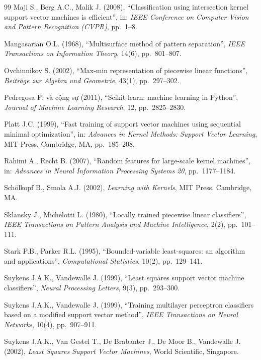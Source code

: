 \begin{thebibliography}{99}
 Maji S., Berg A.C., Malik J. (2008), “Classification using intersection kernel support vector machines is efficient”, in: \emph{IEEE Conference on Computer Vision and Pattern Recognition (CVPR)}, pp.~1--8.

 Mangasarian O.L. (1968), “Multisurface method of pattern separation”, \emph{IEEE Transactions on Information Theory}, 14(6), pp.~801--807.

 Ovchinnikov S. (2002), “Max-min representation of piecewise linear functions”, \emph{Beiträge zur Algebra und Geometrie}, 43(1), pp.~297--302.

 Pedregosa F. và cộng sự (2011), “Scikit-learn: machine learning in Python”, \emph{Journal of Machine Learning Research}, 12, pp.~2825--2830.

 Platt J.C. (1999), “Fast training of support vector machines using sequential minimal optimization”, in: \emph{Advances in Kernel Methods: Support Vector Learning}, MIT Press, Cambridge, MA, pp.~185--208.

 Rahimi A., Recht B. (2007), “Random features for large-scale kernel machines”, in: \emph{Advances in Neural Information Processing Systems 20}, pp.~1177--1184.

 Schölkopf B., Smola A.J. (2002), \emph{Learning with Kernels}, MIT Press, Cambridge, MA.

 Sklansky J., Michelotti L. (1980), “Locally trained piecewise linear classifiers”, \emph{IEEE Transactions on Pattern Analysis and Machine Intelligence}, 2(2), pp.~101--111.

 Stark P.B., Parker R.L. (1995), “Bounded-variable least-squares: an algorithm and applications”, \emph{Computational Statistics}, 10(2), pp.~129--141.

 Suykens J.A.K., Vandewalle J. (1999), “Least squares support vector machine classifiers”, \emph{Neural Processing Letters}, 9(3), pp.~293--300.

 Suykens J.A.K., Vandewalle J. (1999), “Training multilayer perceptron classifiers based on a modified support vector method”, \emph{IEEE Transactions on Neural Networks}, 10(4), pp.~907--911.

 Suykens J.A.K., Van Gestel T., De Brabanter J., De Moor B., Vandewalle J. (2002), \emph{Least Squares Support Vector Machines}, World Scientific, Singapore.


\end{thebibliography}
